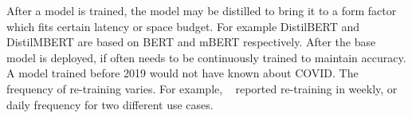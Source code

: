 After a model is trained, the model may be distilled to bring it to a form factor which fits certain latency or space budget. For example  DistilBERT \cite{DBLP:journals/corr/abs-1910-01108}and DistilMBERT are based on BERT and mBERT respectively.  
After the base model is deployed, if often needs to be continuously trained to maintain accuracy. A model trained before 2019 would not have known about COVID. The frequency of re-training varies. For example, 
~\cite{Wu2022} reported re-training in weekly, or daily
frequency for two different use cases. 
